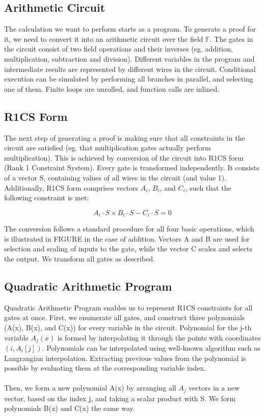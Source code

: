 \subsection{Arithmetic Circuit}

The calculation we want to perform starts as a program. To generate a proof for it, we need to convert it into an arithmetic circuit over the field $\mathbb{F}$. The gates in the circuit consist of two field operations and their inverses (eg. addition, multiplication, subtraction and division). Different variables in the program and intermediate results are represented by different wires in the circuit. Conditional execution can be simulated by performing all branches in parallel, and selecting one of them. Finite loops are unrolled, and function calls are inlined.

\subsection{R1CS Form}
The next step of generating a proof is making sure that all constraints in the circuit are satisfied (eg. that multiplication gates actually perform multiplication). This is achieved by conversion of the circuit into R1CS form (Rank 1 Constraint System). Every gate is transformed independently. It consists of a vector S, containing values of all wires in the circuit (and value 1). Additionally, R1CS form comprises vectors $A_i$, $B_i$, and $C_i$, such that the following constraint is met:

$$ A_i \cdot S \times B_i \cdot S - C_i \cdot S = 0 $$

The conversion follows a standard procedure for all four basic operations, which is illustrated in FIGURE in the case of addition. Vectors A and B are used for selection and scaling of inputs to the gate, while the vector C scales and selects the output. We transform all gates as described.

\subsection{Quadratic Arithmetic Program}
Quadratic Arithmetic Program enables us to represent R1CS constraints for all gates at once. First, we enumerate all gates, and construct three polynomials (A(x), B(x), and C(x)) for every variable in the circuit. Polynomial for the j-th variable $A_j(x)$ is formed by interpolating it through the points with coordinates $(i, A_i[j])$. 
Polynomials can be interpolated using well-known algorithm such as Langrangian interpolation. Extracting previous values from the polynomial is possible by evaluating them at the corresponding variable index.\\
\\
Then, we form a new polynomial A(x) by arranging all $A_j$ vectors in a new vector, based on the index j, and taking a scalar product with S. We form polynomials B(x) and C(x) the same way.

